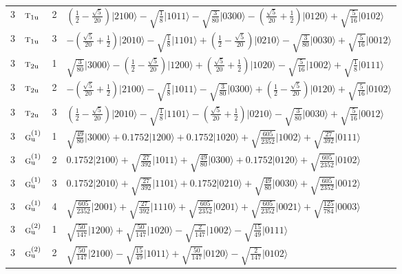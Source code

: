 \documentclass[11pt]{article}
\newcommand{\irr}[1]{\text{\normalfont\scshape #1}}
\newcommand{\ptag}[1]{\mathrm{#1}}
\newcommand{\occ}[1]{\lvert #1\rangle}
\begin{document}
\begin{longtable}{c l c p{}}
3 & $\irr{t}_{1\ptag{u}}$ & 2 & $(\frac{1}{2} - \frac{\sqrt{5}}{20})\occ{2100}-\sqrt{\tfrac{1}{8}}\occ{1011}-\sqrt{\tfrac{3}{80}}\occ{0300}-(\frac{\sqrt{5}}{20} + \frac{1}{2})\occ{0120}+\sqrt{\tfrac{5}{16}}\occ{0102}$\\
3 & $\irr{t}_{1\ptag{u}}$ & 3 & $-(\frac{\sqrt{5}}{20} + \frac{1}{2})\occ{2010}-\sqrt{\tfrac{1}{8}}\occ{1101}+(\frac{1}{2} - \frac{\sqrt{5}}{20})\occ{0210}-\sqrt{\tfrac{3}{80}}\occ{0030}+\sqrt{\tfrac{5}{16}}\occ{0012}$\\
3 & $\irr{t}_{2\ptag{u}}$ & 1 & $\sqrt{\tfrac{3}{80}}\occ{3000}-(\frac{1}{2} - \frac{\sqrt{5}}{20})\occ{1200}+(\frac{\sqrt{5}}{20} + \frac{1}{2})\occ{1020}-\sqrt{\tfrac{5}{16}}\occ{1002}+\sqrt{\tfrac{1}{8}}\occ{0111}$\\
3 & $\irr{t}_{2\ptag{u}}$ & 2 & $-(\frac{\sqrt{5}}{20} + \frac{1}{2})\occ{2100}-\sqrt{\tfrac{1}{8}}\occ{1011}-\sqrt{\tfrac{3}{80}}\occ{0300}+(\frac{1}{2} - \frac{\sqrt{5}}{20})\occ{0120}+\sqrt{\tfrac{5}{16}}\occ{0102}$\\
3 & $\irr{t}_{2\ptag{u}}$ & 3 & $(\frac{1}{2} - \frac{\sqrt{5}}{20})\occ{2010}-\sqrt{\tfrac{1}{8}}\occ{1101}-(\frac{\sqrt{5}}{20} + \frac{1}{2})\occ{0210}-\sqrt{\tfrac{3}{80}}\occ{0030}+\sqrt{\tfrac{5}{16}}\occ{0012}$\\
3 & $\irr{g}_{\ptag{u}}^{(1)}$ & 1 & $\sqrt{\tfrac{49}{80}}\occ{3000}+0.1752\occ{1200}+0.1752\occ{1020}+\sqrt{\tfrac{605}{2352}}\occ{1002}+\sqrt{\tfrac{27}{392}}\occ{0111}$\\
3 & $\irr{g}_{\ptag{u}}^{(1)}$ & 2 & $0.1752\occ{2100}+\sqrt{\tfrac{27}{392}}\occ{1011}+\sqrt{\tfrac{49}{80}}\occ{0300}+0.1752\occ{0120}+\sqrt{\tfrac{605}{2352}}\occ{0102}$\\
3 & $\irr{g}_{\ptag{u}}^{(1)}$ & 3 & $0.1752\occ{2010}+\sqrt{\tfrac{27}{392}}\occ{1101}+0.1752\occ{0210}+\sqrt{\tfrac{49}{80}}\occ{0030}+\sqrt{\tfrac{605}{2352}}\occ{0012}$\\
3 & $\irr{g}_{\ptag{u}}^{(1)}$ & 4 & $\sqrt{\tfrac{605}{2352}}\occ{2001}+\sqrt{\tfrac{27}{392}}\occ{1110}+\sqrt{\tfrac{605}{2352}}\occ{0201}+\sqrt{\tfrac{605}{2352}}\occ{0021}+\sqrt{\tfrac{125}{784}}\occ{0003}$\\
3 & $\irr{g}_{\ptag{u}}^{(2)}$ & 1 & $\sqrt{\tfrac{50}{147}}\occ{1200}+\sqrt{\tfrac{50}{147}}\occ{1020}-\sqrt{\tfrac{2}{147}}\occ{1002}-\sqrt{\tfrac{15}{49}}\occ{0111}$\\
3 & $\irr{g}_{\ptag{u}}^{(2)}$ & 2 & $\sqrt{\tfrac{50}{147}}\occ{2100}-\sqrt{\tfrac{15}{49}}\occ{1011}+\sqrt{\tfrac{50}{147}}\occ{0120}-\sqrt{\tfrac{2}{147}}\occ{0102}$\\

\end{longtable}
\end{document}
